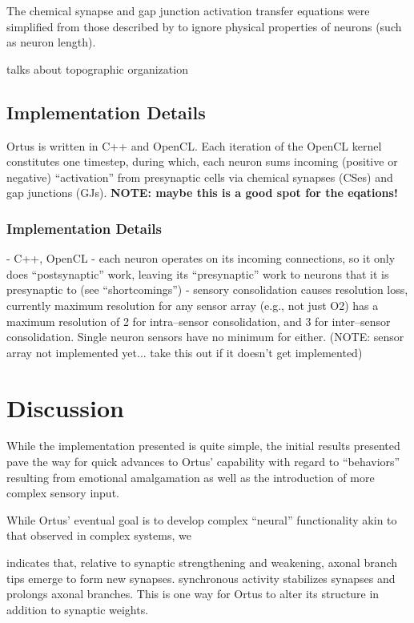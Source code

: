 \documentclass[letterpaper]{article}
\begin{document}
The chemical synapse and gap junction activation transfer equations were simplified from those described by \cite{Wicks1996} to ignore physical properties of neurons (such as neuron length).


\cite{wiredforbehaviors} talks about topographic organization

\subsection{Implementation Details} Ortus is written in C++ and OpenCL. Each iteration of the OpenCL kernel constitutes one timestep, during which, each neuron sums incoming (positive or negative) ``activation'' from presynaptic cells via chemical synapses (CSes) and gap junctions (GJs).  \textbf{NOTE: maybe this is a good spot for the eqations!}




% 


\subsubsection{Implementation Details}
- C++, OpenCL
- each neuron operates on its incoming connections, so it only does ``postsynaptic'' work, leaving its ``presynaptic'' work to neurons that it is presynaptic to (see ``shortcomings'')
- sensory consolidation causes resolution loss, currently maximum resolution for any sensor array (e.g., not just O2) has a maximum resolution of 2 for intra--sensor consolidation, and 3 for inter--sensor consolidation. Single neuron sensors have no minimum for either. (NOTE: sensor array not implemented yet... take this out if it doesn't get implemented)

\section{Discussion}
While the implementation presented is quite simple, the initial results presented pave the way for quick advances to Ortus' capability with regard to ``behaviors'' resulting from emotional amalgamation as well as the introduction of more complex sensory input.


While Ortus' eventual goal is to develop complex ``neural'' functionality akin to that observed in complex systems, we

\citet{Kutsarova2016} indicates that, relative to synaptic strengthening and weakening, axonal branch tips emerge to form new synapses. synchronous activity stabilizes synapses and prolongs axonal branches. This is one way for Ortus to alter its structure in addition to synaptic weights.
\end{document}
